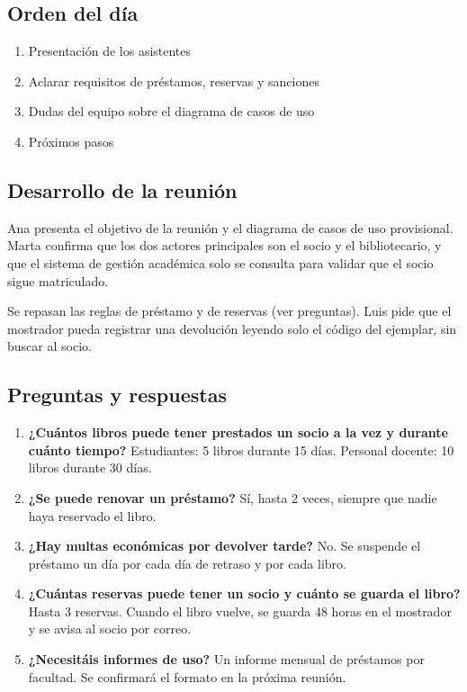 \documentclass[11pt,a4paper]{article}
\begin{document}
\subsection*{Orden del día}

\begin{enumerate}
\item Presentación de los asistentes
\item Aclarar requisitos de préstamos, reservas y sanciones
\item Dudas del equipo sobre el diagrama de casos de uso
\item Próximos pasos
\end{enumerate}

\subsection*{Desarrollo de la reunión}

Ana presenta el objetivo de la reunión y el diagrama de casos de uso provisional. Marta confirma que los dos actores principales son el socio y el bibliotecario, y que el sistema de gestión académica solo se consulta para validar que el socio sigue matriculado.

Se repasan las reglas de préstamo y de reservas (ver preguntas). Luis pide que el mostrador pueda registrar una devolución leyendo solo el código del ejemplar, sin buscar al socio.

\subsection*{Preguntas y respuestas}

\begin{enumerate}
\item \textbf{¿Cuántos libros puede tener prestados un socio a la vez y durante cuánto tiempo?}
Estudiantes: 5 libros durante 15 días. Personal docente: 10 libros durante 30 días.
\item \textbf{¿Se puede renovar un préstamo?}
Sí, hasta 2 veces, siempre que nadie haya reservado el libro.
\item \textbf{¿Hay multas económicas por devolver tarde?}
No. Se suspende el préstamo un día por cada día de retraso y por cada libro.
\item \textbf{¿Cuántas reservas puede tener un socio y cuánto se guarda el libro?}
Hasta 3 reservas. Cuando el libro vuelve, se guarda 48 horas en el mostrador y se avisa al socio por correo.
\item \textbf{¿Necesitáis informes de uso?}
Un informe mensual de préstamos por facultad. Se confirmará el formato en la próxima reunión.
\end{enumerate}
\end{document}
